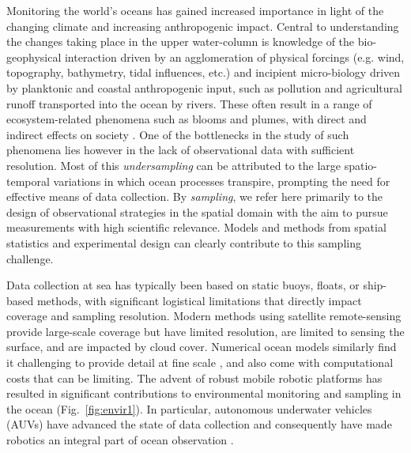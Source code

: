 \documentclass[aoas,preprint]{imsart}
\begin{document}
Monitoring the world's oceans has gained increased importance in light
of the changing climate and increasing anthropogenic impact. Central
to understanding the changes taking place in the upper water-column is
knowledge of the bio-geophysical interaction driven by an
agglomeration of physical forcings (e.g. wind, topography, bathymetry,
tidal influences, etc.) and incipient micro-biology driven by
planktonic and coastal anthropogenic input, such as pollution and
agricultural runoff transported into the ocean by rivers.  These often
result in a range of ecosystem-related phenomena such as blooms and
plumes, with direct and indirect effects on society \citep{ryan2017}. One of the
bottlenecks in the study of such phenomena lies however in the lack of
observational data with sufficient resolution. Most of this
\emph{undersampling} can be attributed to the large spatio-temporal
variations in which ocean processes transpire, prompting the need for
effective means of data collection.  By \emph{sampling}, we refer here
primarily to the design of observational strategies in the spatial
domain with the aim to pursue measurements with high scientific
relevance. Models and methods from spatial statistics and experimental design can clearly contribute to this sampling challenge.

 
Data collection at sea has typically been based on static buoys,
floats, or ship-based methods, with significant logistical limitations
that directly impact coverage and sampling resolution. Modern methods
using satellite remote-sensing provide large-scale coverage but have
limited resolution, are limited to sensing the surface, and are
impacted by cloud cover. Numerical ocean models similarly find it
challenging to provide detail at fine scale \citep{Lermusiaux:2006},
and also come with computational costs that can be limiting. The
advent of robust mobile robotic platforms \citep{Bellingham07} has
resulted in significant contributions to environmental monitoring and
sampling in the ocean (Fig.~\ref{fig:envir1}). In particular,
autonomous underwater vehicles (AUVs) have advanced the state of data
collection and consequently have made robotics an integral part of
ocean observation \citep{das11b,Das2015,fossuminformation,fossum18b}.
\end{document}
